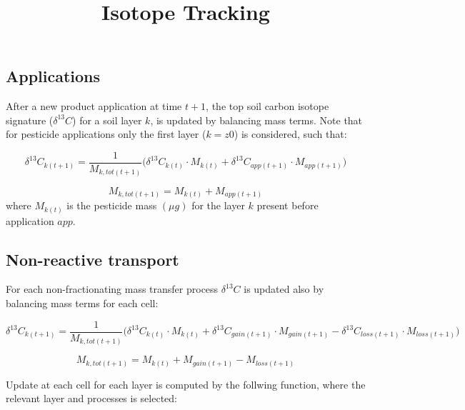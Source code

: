 \documentclass[]{article}
\title{Isotope Tracking}
\author{}
\date{}
\begin{document}
\maketitle

\hypertarget{applications}{%
\subsection{Applications}\label{applications}}

After a new product application at time \(t+1\), the top soil carbon
isotope signature (\(\delta ^{13}C\)) for a soil layer \(k\), is updated
by balancing mass terms. Note that for pesticide applications only the
first layer (\(k=z0\)) is considered, such that:

\[
\delta ^{13}C_{k(t+1)} = \frac{1}{M_{k,tot(t+1)}} \Big(\delta ^{13}C_{k(t)} \cdot M_{k(t)} + \delta ^{13}C_{app(t+1)} \cdot M_{app(t+1)}  \Big)
\]

\[
M_{k,tot(t+1)} =  M_{k(t)} + M_{app(t+1)}
\] where \(M_{k(t)}\) is the pesticide mass \((\mu g)\) for the layer
\(k\) present before application \(app\).

\hypertarget{non-reactive-transport}{%
\subsection{Non-reactive transport}\label{non-reactive-transport}}

For each non-fractionating mass transfer process \(\delta ^{13}C\) is
updated also by balancing mass terms for each cell:

\[
\delta ^{13}C_{k(t+1)} = \frac{1}{M_{k,tot(t+1)}} \Big(\delta ^{13}C_{k(t)} \cdot M_{k(t)} + \delta ^{13}C_{gain(t+1)} \cdot M_{gain(t+1)} -  \delta ^{13}C_{loss(t+1)} \cdot M_{loss(t+1)}  \Big)
\]

\[
M_{k,tot(t+1)} =  M_{k(t)} + M_{gain(t+1)} -  M_{loss(t+1)}
\]

Update at each cell for each layer is computed by the follwing function,
where the relevant layer and processes is selected:
\end{document}
